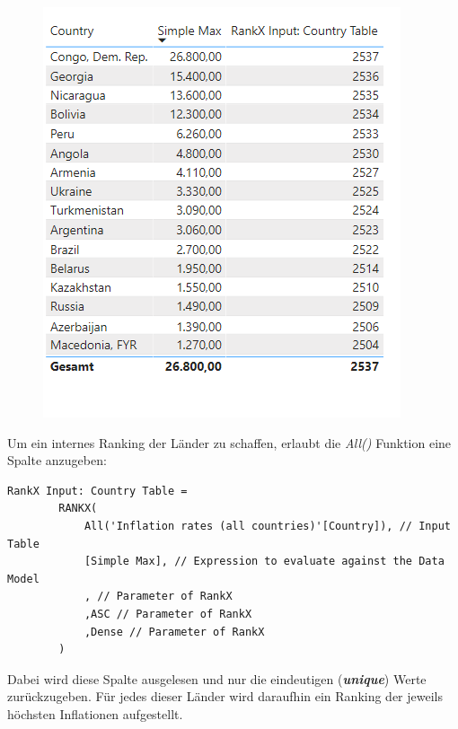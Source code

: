 \begin{figure}[H]
	\centering
	\includegraphics[scale = 0.3]{attachment/chapter_1/Scc153}
\end{figure}
Um ein internes Ranking der Länder zu schaffen, erlaubt die \textit{All()} Funktion eine Spalte anzugeben:
\begin{lstlisting}[style=DAX]
	RankX Input: Country Table = 
		RANKX(
			All('Inflation rates (all countries)'[Country]), // Input Table
			[Simple Max], // Expression to evaluate against the Data Model
			, // Parameter of RankX
			,ASC // Parameter of RankX
			,Dense // Parameter of RankX
		)
\end{lstlisting}
 Dabei wird diese Spalte ausgelesen und nur die eindeutigen (\textit{\textbf{unique}}) Werte zurückzugeben. Für jedes dieser Länder wird daraufhin ein Ranking der jeweils höchsten Inflationen aufgestellt.

